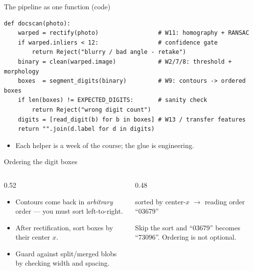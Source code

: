 \documentclass[10pt,aspectratio=169]{beamer}
\begin{document}
\begin{frame}[fragile]{The pipeline as one function (code)}
\begin{lstlisting}
def docscan(photo):
    warped = rectify(photo)                 # W11: homography + RANSAC
    if warped.inliers < 12:                 # confidence gate
        return Reject("blurry / bad angle - retake")
    binary = clean(warped.image)            # W2/7/8: threshold + morphology
    boxes  = segment_digits(binary)         # W9: contours -> ordered boxes
    if len(boxes) != EXPECTED_DIGITS:       # sanity check
        return Reject("wrong digit count")
    digits = [read_digit(b) for b in boxes] # W13 / transfer features
    return "".join(d.label for d in digits)
\end{lstlisting}
  \begin{itemize}
    \item Each helper is a week of the course; the glue is engineering.
  \end{itemize}
\end{frame}

\begin{frame}{Ordering the digit boxes}
  \begin{columns}[T]
    \begin{column}{0.52\textwidth}
      \begin{itemize}
        \item Contours come back in \emph{arbitrary} order — you must sort left-to-right.
        \item After rectification, sort boxes by their center $x$.
        \item Guard against split/merged blobs by checking width and spacing.
      \end{itemize}
    \end{column}
    \begin{column}{0.48\textwidth}
      \begin{center}
      \end{center}
      {\scriptsize sorted by center-$x$ $\rightarrow$ reading order ``03679''}
      \begin{badbox}
        Skip the sort and ``03679'' becomes ``73096''. Ordering is not optional.
      \end{badbox}
    \end{column}
  \end{columns}
\end{frame}

\end{document}
